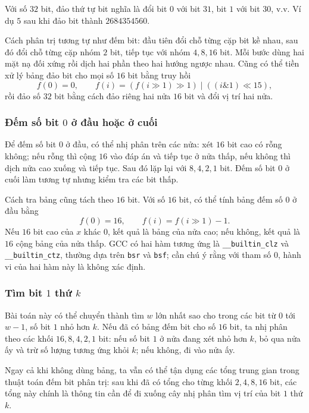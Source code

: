\documentclass[11pt]{article}
\begin{document}
Với số \(32\) bit, đảo thứ tự bit nghĩa là đổi bit \(0\) với bit \(31\), bit
\(1\) với bit \(30\), v.v. Ví dụ \(5\) sau khi đảo bit thành
\(2684354560\).

Cách phân trị tương tự như đếm bit: đầu tiên đổi chỗ từng cặp bit kề nhau, sau
đó đổi chỗ từng cặp nhóm \(2\) bit, tiếp tục với nhóm \(4,8,16\) bit. Mỗi bước
dùng hai mặt nạ đối xứng rồi dịch hai phần theo hai hướng ngược nhau. Cũng có
thể tiền xử lý bảng đảo bit cho mọi số \(16\) bit bằng truy hồi
\[
  f(0)=0,\qquad
  f(i)=(f(i\gg 1)\gg 1)\;|\;((i\&1)\ll 15),
\]
rồi đảo số \(32\) bit bằng cách đảo riêng hai nửa \(16\) bit và đổi vị trí hai
nửa.

\subsubsection{\texorpdfstring{Đếm số bit \(0\) ở đầu hoặc ở cuối}{Đếm số bit 0 ở đầu hoặc ở cuối}}

Để đếm số bit \(0\) ở đầu, có thể nhị phân trên các nửa: xét \(16\) bit cao có
rỗng không; nếu rỗng thì cộng \(16\) vào đáp án và tiếp tục ở nửa thấp, nếu
không thì dịch nửa cao xuống và tiếp tục. Sau đó lặp lại với \(8,4,2,1\) bit.
Đếm số bit \(0\) ở cuối làm tương tự nhưng kiểm tra các bit thấp.

Cách tra bảng cũng tách theo \(16\) bit. Với số \(16\) bit, có thể tính bảng
đếm số \(0\) ở đầu bằng
\[
  f(0)=16,\qquad f(i)=f(i\gg 1)-1.
\]
Nếu \(16\) bit cao của \(x\) khác \(0\), kết quả là bảng của nửa cao; nếu không,
kết quả là \(16\) cộng bảng của nửa thấp. GCC có hai hàm tương ứng là
\texttt{\_\_builtin\_clz} và \texttt{\_\_builtin\_ctz}, thường dựa trên
\texttt{bsr} và \texttt{bsf}; cần chú ý rằng với tham số \(0\), hành vi của
hai hàm này là không xác định.

\subsubsection{\texorpdfstring{Tìm bit \(1\) thứ \(k\)}{Tìm bit 1 thứ k}}

Bài toán này có thể chuyển thành tìm \(w\) lớn nhất sao cho trong các bit từ
\(0\) tới \(w-1\), số bit \(1\) nhỏ hơn \(k\). Nếu đã có bảng đếm bit cho số
\(16\) bit, ta nhị phân theo các khối \(16,8,4,2,1\) bit: nếu số bit \(1\) ở
nửa đang xét nhỏ hơn \(k\), bỏ qua nửa ấy và trừ số lượng tương ứng khỏi \(k\);
nếu không, đi vào nửa ấy.

Ngay cả khi không dùng bảng, ta vẫn có thể tận dụng các tổng trung gian trong
thuật toán đếm bit phân trị: sau khi đã có tổng cho từng khối \(2,4,8,16\) bit,
các tổng này chính là thông tin cần để đi xuống cây nhị phân tìm vị trí của
bit \(1\) thứ \(k\).
\end{document}
